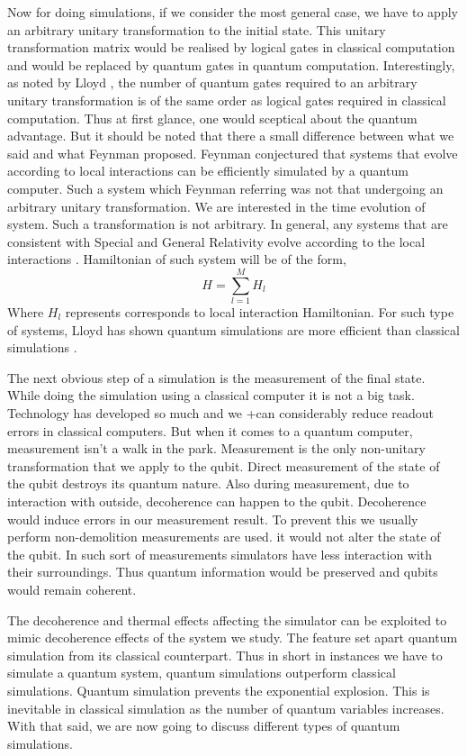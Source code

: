 \documentclass[12pt,a4paper]{report}
\begin{document}
Now for doing simulations, if we consider the most general case, we have to apply an arbitrary unitary transformation to the initial state. This unitary transformation matrix would be realised by logical gates in classical computation and would be replaced by quantum gates in quantum computation. Interestingly, as noted by Lloyd \cite{lloyd}, the number of quantum gates required to an arbitrary unitary transformation is of the same order as logical gates required in classical computation. Thus at first glance, one would sceptical about the quantum advantage. But it should be noted that there a small difference between what we said and what Feynman proposed. Feynman conjectured that systems that evolve according to local interactions can be efficiently simulated by a quantum computer. Such a system which Feynman referring was not that undergoing an arbitrary unitary transformation.  We are interested in the time evolution of system. Such a transformation is not arbitrary. In general, any systems that are consistent with Special and General Relativity evolve according to the local interactions \cite{lloyd}. Hamiltonian of such system will be of the form,
\begin{equation}
H= \sum_{l=1}^{M} H_{l}
\end{equation}
Where $H_{l}$ represents corresponds to local interaction Hamiltonian. For such type of systems, Lloyd has shown quantum simulations are more efficient than classical simulations \cite{lloyd}.

The next obvious step of a simulation is the measurement of the final state. While doing the simulation using a classical computer it is not a big task. Technology has developed so much and we +can considerably reduce readout errors in classical computers. But when it comes to a quantum computer, measurement isn’t a walk in the park. Measurement is the only non-unitary transformation that we apply to the qubit.  Direct measurement of the state of the qubit destroys its quantum nature.  Also during measurement, due to interaction with outside, decoherence can happen to the qubit. Decoherence would induce errors in our measurement result. To prevent this we usually perform non-demolition measurements are used. it would not alter the state of the qubit. In such sort of measurements simulators have less interaction with their surroundings. Thus quantum information would be preserved and qubits would remain coherent. 

The decoherence and thermal effects affecting the simulator can be exploited to mimic decoherence effects of the system we study. The feature set apart quantum simulation from its classical counterpart. Thus in short in instances we have to simulate a quantum system, quantum simulations outperform classical simulations. Quantum simulation prevents the exponential explosion. This is inevitable in classical simulation as the number of quantum variables increases. With that said, we are now going to discuss different types of quantum simulations.
\end{document}
